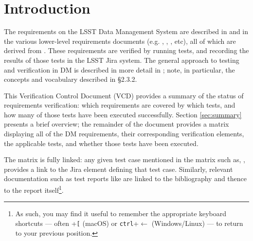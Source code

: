 
\section{Introduction}
\label{sec:intro}

The requirements on the LSST Data Management System are described in  and in the various lower-level 
requirements documents (e.g. , , , etc), all of which are derived from .
These requirements are verified by running tests, and recording the results of those tests in the LSST Jira system.
The general approach to testing and verification in DM is described in more detail in ; note, in particular, the concepts and vocabulary described in  \S2.3.2.

This Verification Control Document (VCD) provides a summary of the status of requirements verification: which requirements are covered by which tests, and how many of those tests have been executed successfully.
Section \ref{sec:summary} presents a brief overview; the remainder of the document provides a matrix displaying all of the DM requirements, their corresponding verification elements, the applicable tests, and whether those tests have been executed.

The matrix is fully linked: any given test case mentioned in the matrix such as, , provides a link to the Jira element defining that test case.
Similarly, relevant documentation such as test reports like  are linked to the bibliography and thence to the report itself\footnote{As such, you may find it useful to remember the appropriate keyboard shortcuts --- often \cmdkey{}+\texttt{[} (macOS) or \texttt{ctrl}+{$\leftarrow$ (Windows/Linux}) --- to return to your previous position.}.
